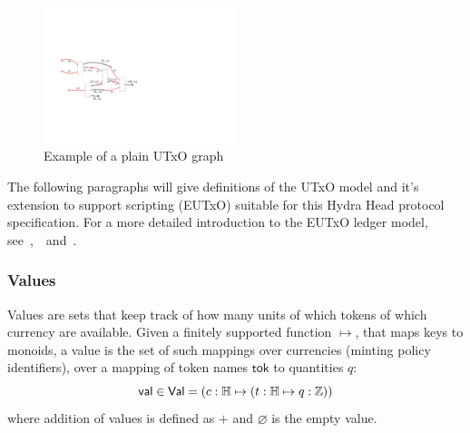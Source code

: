 \begin{figure}[h]
	\centering
	\includegraphics[width=0.5\textwidth]{figures/utxo-graph.pdf}
	\caption{Example of a plain UTxO graph}\label{fig:utxo-graph}
\end{figure}

The following paragraphs will give definitions of the UTxO model and it's
extension to support scripting (EUTxO) suitable for this Hydra Head protocol
specification. For a more detailed introduction to the EUTxO ledger model,
see~\cite{eutxo},~\cite{eutxo-2}~and~\cite{utxo-ma}.

\subsubsection{Values}

\begin{definition}[Values]
	Values are sets that keep track of how many units of which tokens of which
	currency are available. Given a finitely supported function $\mapsto$, that
	maps keys to monoids, a value is the set of such mappings over currencies
	(minting policy identifiers), over a mapping of token names $\mathsf{tok}$ to
	quantities $q$:
	\[
		\mathsf{val} \in \mathsf{Val} = (c : \mathbb{H} \mapsto (t : \mathbb{H} \mapsto q : \mathbb{Z}))
	\]
	\noindent where addition of values is defined as $+$ and $\varnothing$ is the empty value.
\end{definition}



